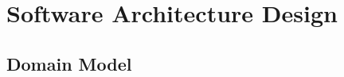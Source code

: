 \chapter{Software Architecture Design}
\label{chap:software-architecture-design}

\section{Domain Model}
\label{section:domain-model}








